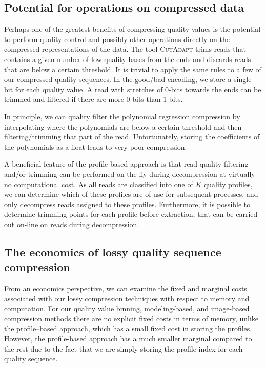 \documentclass{bioinfo}
\begin{document}
\subsection{Potential for operations on compressed data}

Perhaps one of the greatest benefits of compressing quality values is the potential to perform quality control and possibly other operations directly on the compressed representations of the data. The tool \textsc{CutAdapt} trims reads that contains a given number of low quality bases from the ends and discards reads that are below a certain threshold. It is trivial to apply the same rules to a few of our compressed quality sequences. In the good/bad encoding, we store a single bit for each quality value. A read with stretches of 0-bits towards the ends can be trimmed and filtered if there are more 0-bits than 1-bits.

In principle, we can quality filter the polynomial regression compression by interpolating where the polynomials are below a certain threshold and then filtering/trimming that part of the read. Unfortunately, storing the coefficients of the polynomials as a float leads to very poor compression.

A beneficial feature of the profile-based approach is that read quality filtering and/or trimming can be performed on the fly during decompression at virtually no computational cost. As all reads are classified into one of $K$ quality profiles, we can determine which of these profiles are of use for subsequent processes, and only decompress reads assigned to these profiles. Furthermore, it is possible to determine trimming points for each profile before extraction, that can be carried out on-line on reads during decompression.

\subsection{The economics of lossy quality sequence compression}

From an economics perspective, we can examine the fixed and marginal costs associated with our lossy compression techniques with respect to memory and computation.
For our quality value binning, modeling-based, and image-based compression methods there are no explicit fixed costs in terms of memory, unlike the profile--based approach, which has a small fixed cost in storing the profiles.
However, the profile-based approach has a much smaller marginal compared to the rest due to the fact that we are simply storing the profile index for each quality sequence.
\end{document}
